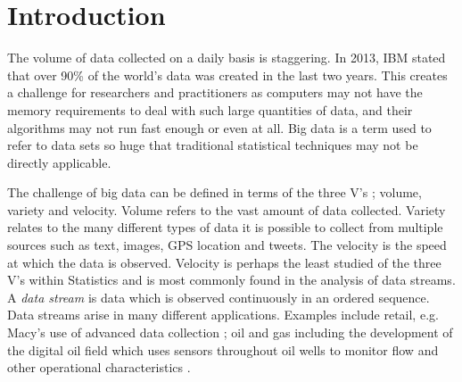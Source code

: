 %							

%								

\chapter{Introduction}



The volume of data collected on a daily basis is staggering.  In 2013,  IBM stated  that over 90\% of the world's data was created in the last two years. This creates a challenge for researchers and practitioners as computers may not have the memory requirements to deal with such large quantities of data, and their algorithms may not run fast enough or even at all.  Big data \citep{Buhlmann2016} is a term used to refer to data sets so huge that traditional statistical techniques may not be directly applicable.%

The challenge of big data can be defined in terms of the three V's \citep{Laney2001}; volume, variety and velocity. Volume refers to the vast amount of data collected. Variety relates to the many different types of data it is possible to collect from multiple sources such as text, images, GPS location and tweets.  The velocity is the speed at which the data is observed. Velocity is perhaps the least studied of the three V's within Statistics and is most commonly found in the analysis of data streams. A \textit{data stream} \citep{Aggarwal2007, Gama2007}  is data which is observed continuously in an ordered sequence. Data streams arise in many different applications. Examples include retail, e.g. Macy's use of advanced data collection \citep{Kleijnen2016}; oil and gas including the development of the digital oil field which uses sensors throughout oil wells to monitor flow and other operational characteristics \citep{Cramer2008, Patri2012}.

